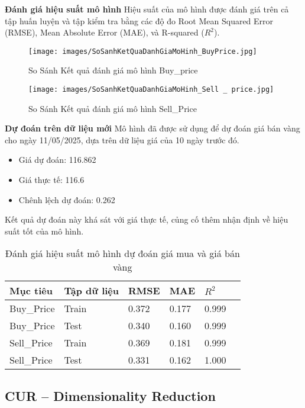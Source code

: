 \documentclass[conference]{IEEEtran}
\begin{document}
\textbf{Đánh giá hiệu suất mô hình}
Hiệu suất của mô hình được đánh giá trên cả tập huấn luyện và tập kiểm tra bằng các độ đo Root Mean Squared Error (RMSE), Mean Absolute Error (MAE), và R-squared ($R^2$).
\begin{figure}
    \centering
    \texttt{[image: images/SoSanhKetQuaDanhGiaMoHinh\_BuyPrice.jpg]}
    \caption{So Sánh Kết quả đánh giá mô hình \- Buy\_price}
    \label{fig:enter-label}
\end{figure}

\begin{figure}
    \centering
    \texttt{[image: images/SoSanhKetQuaDanhGiaMoHinh\_Sell \_ price.jpg]}
    \caption{So Sánh Kết quả đánh giá mô hình \- Sell\_Price}
    \label{fig:enter-label}
\end{figure}

\textbf{Dự đoán trên dữ liệu mới }
Mô hình đã được sử dụng để dự đoán giá bán vàng cho ngày 11/05/2025, dựa trên dữ liệu giá của 10 ngày trước đó.
\begin{itemize}
    \item Giá dự đoán: 116.862
    \item Giá thực tế: 116.6
    \item Chênh lệch dự đoán: 0.262
\end{itemize}
Kết quả dự đoán này khá sát với giá thực tế, củng cố thêm nhận định về hiệu suất tốt của mô hình.

\begin{table}[h!]
\centering
\caption{Đánh giá hiệu suất mô hình dự đoán giá mua và giá bán vàng}

\begin{tabular}{llllll}
\toprule
\textbf{Mục tiêu} & \textbf{Tập dữ liệu} & \textbf{RMSE} & \textbf{MAE} & \textbf{$R^2$} \\
\midrule
Buy\_Price & Train & 0.372 & 0.177 & 0.999 \\
Buy\_Price & Test  & 0.340 & 0.160 & 0.999 \\
Sell\_Price & Train & 0.369 & 0.181 & 0.999 \\
Sell\_Price & Test  & 0.331 & 0.162 & 1.000 \\
\bottomrule
\end{tabular}
\end{table}

\subsection{CUR – Dimensionality Reduction}
\end{document}
